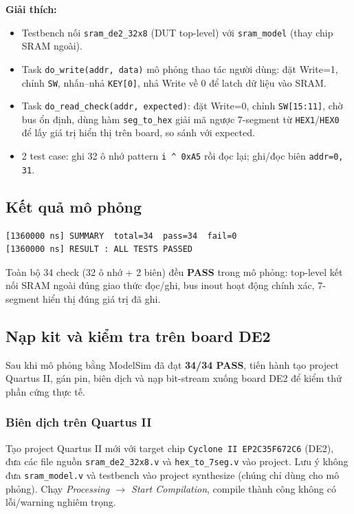 \documentclass[12pt,a4paper]{article}
\begin{document}
\textbf{Giải thích:}
\begin{itemize}[leftmargin=1.5cm]
    \item Testbench nối \texttt{sram\_de2\_32x8} (DUT top-level) với \texttt{sram\_model} (thay chip SRAM ngoài).
    \item Task \texttt{do\_write(addr, data)} mô phỏng thao tác người dùng: đặt Write=1, chỉnh \texttt{SW}, nhấn--nhả \texttt{KEY[0]}, nhả Write về 0 để latch dữ liệu vào SRAM.
    \item Task \texttt{do\_read\_check(addr, expected)}: đặt Write=0, chỉnh \texttt{SW[15:11]}, chờ bus ổn định, dùng hàm \texttt{seg\_to\_hex} giải mã ngược 7-segment từ \texttt{HEX1}/\texttt{HEX0} để lấy giá trị hiển thị trên board, so sánh với expected.
    \item 2 test case: ghi 32 ô nhớ pattern \texttt{i \^{} 0xA5} rồi đọc lại; ghi/đọc biên \texttt{addr=0, 31}.
\end{itemize}

\subsection{Kết quả mô phỏng}

\begin{lstlisting}[style=log, caption={Tóm tắt -- tb\_sram\_de2\_32x8.log}]
[1360000 ns] SUMMARY  total=34  pass=34  fail=0
[1360000 ns] RESULT : ALL TESTS PASSED
\end{lstlisting}

Toàn bộ 34 check (32 ô nhớ + 2 biên) đều \textbf{PASS} trong mô phỏng: top-level kết nối SRAM ngoài đúng giao thức đọc/ghi, bus inout hoạt động chính xác, 7-segment hiển thị đúng giá trị đã ghi.

\subsection{Nạp kit và kiểm tra trên board DE2}

Sau khi mô phỏng bằng ModelSim đã đạt \textbf{34/34 PASS}, tiến hành tạo project Quartus II, gán pin, biên dịch và nạp bit-stream xuống board DE2 để kiểm thử phần cứng thực tế.

\subsubsection{Biên dịch trên Quartus II}

Tạo project Quartus II mới với target chip \texttt{Cyclone II EP2C35F672C6} (DE2), đưa các file nguồn \texttt{sram\_de2\_32x8.v} và \texttt{hex\_to\_7seg.v} vào project. Lưu ý không đưa \texttt{sram\_model.v} và testbench vào project synthesize (chúng chỉ dùng cho mô phỏng). Chạy \textit{Processing $\rightarrow$ Start Compilation}, compile thành công không có lỗi/warning nghiêm trọng.
\end{document}
